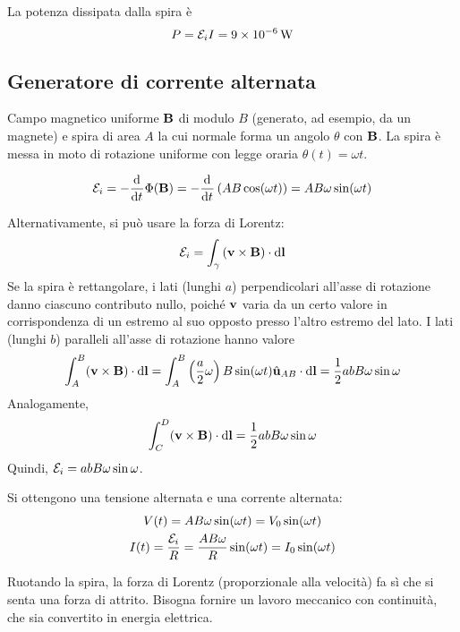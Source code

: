La potenza dissipata dalla spira è
\begin{equation}
    P = \mathcal{E}_i I = \qty{9e-6}{\watt}
\end{equation}


\subsection{Generatore di corrente alternata}

Campo magnetico uniforme $\mathbf{B}$ di modulo $B$ (generato, ad esempio, da un magnete) e spira di area $A$ la cui normale forma un angolo $\theta$ con $\mathbf{B}$.
La spira è messa in moto di rotazione uniforme con legge oraria $\theta(t) = \omega t$.

\begin{equation}
    \fem_i = - \der{t} \Phi(\B)
    = - \der{t} \pts{A B \cos(\omega t)}
    = A B \omega \sin(\omega t)
\end{equation}

Alternativamente, si può usare la forza di Lorentz:
\begin{equation}
    \mathcal{E}_i = \int_\gamma \left( \mathbf{v} \times \mathbf{B} \right) \cdot \mathrm{d} \mathbf{l}
\end{equation}
Se la spira è rettangolare, i lati (lunghi $a$) perpendicolari all'asse di rotazione danno ciascuno contributo nullo, poiché $\mathbf{v}$ varia da un certo valore in corrispondenza di un estremo al suo opposto presso l'altro estremo del lato.
I lati (lunghi $b$) paralleli all'asse di rotazione hanno valore
\begin{equation}
    \int_A^B (\mathbf{v} \times \mathbf{B}) \cdot \mathrm{d} \mathbf{l}
    = \int_A^B \left( \frac{a}{2}\omega \right) B \sin(\omega t) \hat{\mathbf{u}}_{AB} \cdot \mathrm{d} \mathbf{l}
    = \frac{1}{2} abB \omega \sin\omega
\end{equation}
Analogamente,
\begin{equation}
    \int_C^D (\mathbf{v} \times \mathbf{B}) \cdot \mathrm{d} \mathbf{l}
    = \frac{1}{2} abB \omega \sin\omega
\end{equation}
Quindi, $\mathcal{E}_i = abB \omega \sin\omega$.

Si ottengono una tensione alternata e una corrente alternata:
\begin{subequations}
\begin{gather}
    V(t) = A B \omega \sin(\omega t) = V_0 \sin(\omega t) \\
    I(t) = \frac{\mathcal{E}_i}{R} = \frac{AB \omega}{R} \sin(\omega t) = I_0 \sin(\omega t)
\end{gather}
\end{subequations}

Ruotando la spira, la forza di Lorentz (proporzionale alla velocità) fa sì che si senta una forza di attrito.
Bisogna fornire un lavoro meccanico con continuità, che sia convertito in energia elettrica.

